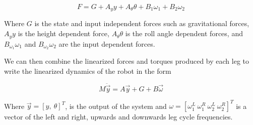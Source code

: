 \begin{equation}
    F = G + A_y y + A_{\theta} \theta + B_1 \omega_1 + B_2 \omega_2
\end{equation}

\noindent Where $G$ is the state and input independent forces such as gravitational forces, $A_y y$ is the height dependent force, $A_{\theta} \theta$ is the roll angle dependent forces, and $B_{\omega_1} \omega_1$ and $B_{\omega_2} \omega_2$ are the input dependent forces.

We can then combine the linearized forces and torques produced by each leg to write the linearized dynamics of the robot in the form

\begin{equation}
    M \ddot{\vec{y}} = A \vec{y} + G + B \vec{\omega} \label{eq:rob_dyn}
\end{equation}

\noindent Where $\vec{y} = [y, \ \theta]^T$, is the output of the system and $\omega = [ \omega_1^L \ \omega_1^R \ \omega_2^L \ \omega_2^R ]^T$ is a vector of the left and right, upwards and downwards leg cycle frequencies.
